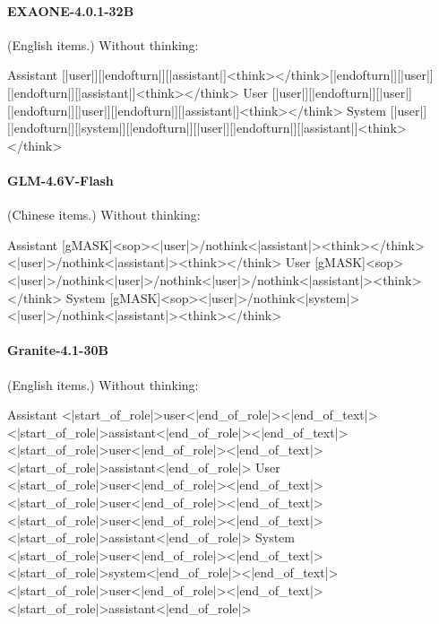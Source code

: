 \paragraph{EXAONE-4.0.1-32B} (English items.)
\noindent Without thinking:
\begin{Rendering}
Assistant  [|user|]\NL{}[|endofturn|]\NL{}[|assistant|]\NL{}<think>\NL{}\NL{}</think>\NL{}\NL{}[|endofturn|]\NL{}[|user|]\NL{}[|endofturn|]\NL{}[|assistant|]\NL{}<think>\NL{}\NL{}</think>\NL{}\NL{}
User       [|user|]\NL{}[|endofturn|]\NL{}[|user|]\NL{}[|endofturn|]\NL{}[|user|]\NL{}[|endofturn|]\NL{}[|assistant|]\NL{}<think>\NL{}\NL{}</think>\NL{}\NL{}
System     [|user|]\NL{}[|endofturn|]\NL{}[|system|]\NL{}[|endofturn|]\NL{}[|user|]\NL{}[|endofturn|]\NL{}[|assistant|]\NL{}<think>\NL{}\NL{}</think>\NL{}\NL{}
\end{Rendering}
\paragraph{GLM-4.6V-Flash} (Chinese items.)
\noindent Without thinking:
\begin{Rendering}
Assistant  [gMASK]<sop><|user|>\NL{}/nothink<|assistant|>\NL{}<think></think>\NL{}<|user|>\NL{}/nothink<|assistant|>\NL{}<think></think>\NL{}
User       [gMASK]<sop><|user|>\NL{}/nothink<|user|>\NL{}/nothink<|user|>\NL{}/nothink<|assistant|>\NL{}<think></think>\NL{}
System     [gMASK]<sop><|user|>\NL{}/nothink<|system|>\NL{}<|user|>\NL{}/nothink<|assistant|>\NL{}<think></think>\NL{}
\end{Rendering}
\paragraph{Granite-4.1-30B} (English items.)
\noindent Without thinking:
\begin{Rendering}
Assistant  <|start_of_role|>user<|end_of_role|><|end_of_text|>\NL{}<|start_of_role|>assistant<|end_of_role|><|end_of_text|>\NL{}<|start_of_role|>user<|end_of_role|><|end_of_text|>\NL{}<|start_of_role|>assistant<|end_of_role|>
User       <|start_of_role|>user<|end_of_role|><|end_of_text|>\NL{}<|start_of_role|>user<|end_of_role|><|end_of_text|>\NL{}<|start_of_role|>user<|end_of_role|><|end_of_text|>\NL{}<|start_of_role|>assistant<|end_of_role|>
System     <|start_of_role|>user<|end_of_role|><|end_of_text|>\NL{}<|start_of_role|>system<|end_of_role|><|end_of_text|>\NL{}<|start_of_role|>user<|end_of_role|><|end_of_text|>\NL{}<|start_of_role|>assistant<|end_of_role|>
\end{Rendering}

